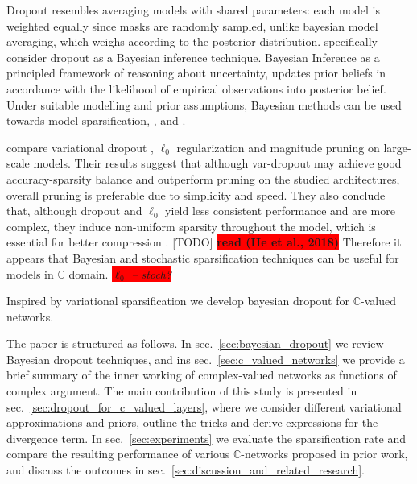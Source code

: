 \documentclass[a4paper,10pt]{article}
\newcommand{\cplx}{\mathbb{C}}
\newcommand{\important}[1]{\textbf{\!\colorbox{red}{#1}\!}}
\newcommand{\verify}[1]{\textit{\!\colorbox{red}{#1}\!}}
\newcommand{\todo}[1]{{\color{blue} [TODO]} \important{#1}}
\begin{document}
Dropout resembles averaging models with shared parameters: each model is weighted equally
since masks are randomly sampled, unlike bayesian model averaging, which weighs according to
the posterior distribution. \citet{kingma_variational_2015} specifically consider dropout
as a Bayesian inference technique. Bayesian Inference as a principled framework of reasoning
about uncertainty, updates prior beliefs in accordance with the likelihood of empirical
observations into posterior belief. Under suitable modelling and prior assumptions, Bayesian
methods can be used towards model sparsification, \citep{kingma_variational_2015,molchanov_variational_2017},
and \citep{kharitonov_variational_2018}.

\citet{gale_state_2019} compare variational dropout \citep{kingma_variational_2015}, $\ell_0$
regularization \citep{louizos_learning_2017} and magnitude pruning on large-scale models.
Their results suggest that although var-dropout may achieve good accuracy-sparsity balance
and outperform pruning on the studied architectures, overall pruning is preferable due to
simplicity and speed. They also conclude that, although dropout and $\ell_0$ yield less
consistent performance and are more complex, they induce non-uniform sparsity throughout
the model, which is essential for better compression \citep{he_amc:_2018}.
\todo{read (He et al., 2018)}
%
%
%
Therefore it appears that Bayesian and stochastic sparsification techniques can be useful
for models in $\cplx$ domain. \verify{$\ell_0$ -- stoch?}


Inspired by variational sparsification we develop bayesian dropout for $\cplx$-valued
networks.

The paper is structured as follows. In sec.~\ref{sec:bayesian_dropout} we review Bayesian
dropout techniques, and ins sec.~\ref{sec:c_valued_networks} we provide a brief summary of
the inner working of complex-valued networks as functions of complex argument. The main
contribution of this study is presented in sec.~\ref{sec:dropout_for_c_valued_layers},
where we consider different variational approximations and priors, outline the tricks
and derive expressions for the divergence term. In sec.~\ref{sec:experiments} we evaluate
the sparsification rate and compare the resulting performance of various $\cplx$-networks
proposed in prior work, and discuss the outcomes in sec.~\ref{sec:discussion_and_related_research}.
\end{document}
